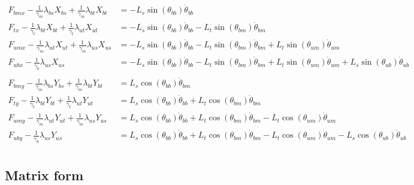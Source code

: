 \documentclass[11pt,twocolumn]{article}
\newcommand{\gb}{\frac{1}{\gamma_b}}
\newcommand{\gm}{\frac{1}{\gamma_m}}
\newcommand{\gt}{\frac{1}{\gamma_t}}
\begin{document}
\begin{align*}
F_{bmx} - \gm\lambda_{bs}X_{bs} + \gm\lambda_{bt}X_{bt} &= -L_s\sin(\theta_{bb})\dot{\theta}_{bb}\\
F_{tx}  - \gt\lambda_{bt}X_{bt} + \gt\lambda_{ut}X_{ut} &= -L_s\sin(\theta_{bb})\dot{\theta}_{bb} - L_t\sin(\theta_{bm})\dot{\theta}_{bm}\\
F_{umx} - \gm\lambda_{ut}X_{ut} + \gm\lambda_{us}X_{us} &= -L_s\sin(\theta_{bb})\dot{\theta}_{bb} - L_t\sin(\theta_{bm})\dot{\theta}_{bm} + L_t\sin(\theta_{um})\dot{\theta}_{um}\\
F_{ubx} - \gb\lambda_{us}X_{us} &= -L_s\sin(\theta_{bb})\dot{\theta}_{bb} - L_t\sin(\theta_{bm})\dot{\theta}_{bm} + L_t\sin(\theta_{um})\dot{\theta}_{um} + L_s\sin(\theta_{ub})\dot{\theta}_{ub}\\
\\
F_{bmy} - \gm\lambda_{bs}Y_{bs} + \gm\lambda_{bt}Y_{bt} &= L_s\cos(\theta_{bb})\dot{\theta}_{bm}\\
F_{ty}  - \gt\lambda_{bt}Y_{bt} + \gt\lambda_{ut}Y_{ut} &= L_s\cos(\theta_{bb})\dot{\theta}_{bb} + L_t\cos(\theta_{bm})\dot{\theta}_{bm}\\
F_{umy} - \gm\lambda_{ut}Y_{ut} + \gm\lambda_{us}Y_{us} &= L_s\cos(\theta_{bb})\dot{\theta}_{bb} + L_t\cos(\theta_{bm})\dot{\theta}_{bm} - L_t\cos(\theta_{um})\dot{\theta}_{um}\\
F_{uby} - \gb\lambda_{us}Y_{us} &= L_s\cos(\theta_{bb})\dot{\theta}_{bb} + L_t\cos(\theta_{bm})\dot{\theta}_{bm} - L_t\cos(\theta_{um})\dot{\theta}_{um} - L_s\cos(\theta_{ub})\dot{\theta}_{ub}\\
\end{align*}


\subsection{Matrix form}
\end{document}
